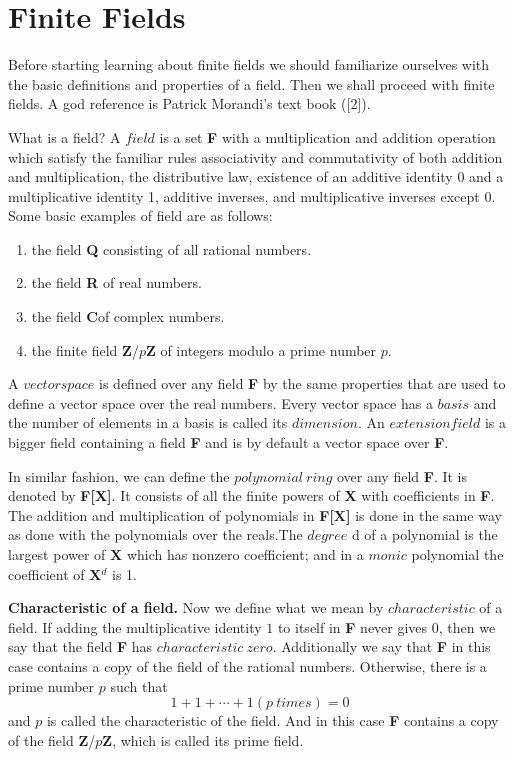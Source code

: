 \documentclass[12pt]{article}
\begin{document}
\section{Finite Fields}
Before starting learning about finite fields we should familiarize
ourselves with the basic definitions and properties of a field. Then
we shall proceed with finite fields. A god reference is Patrick
Morandi's text book ([2]).

What is a field? A $field$ is a set \textbf{F} with a  multiplication and addition operation which satisfy the familiar rules associativity and commutativity of both addition and multiplication, the distributive law, existence of an additive identity 0 and a multiplicative identity 1, additive inverses, and multiplicative inverses except 0. Some basic examples of field are as follows:
\begin{enumerate}
\item the field \textbf{Q} consisting of all rational numbers.
\item the field \textbf{R} of real numbers.
\item the field \textbf{C}of complex numbers.
\item the finite field \textbf{Z}/$p$\textbf{Z} of integers modulo a prime number $p$.
\end{enumerate}
A $vector space$ is defined over any field \textbf{F} by the same properties that are used to define a vector space over the real numbers. Every vector space has a $basis$ and the number of elements in a basis is called its $dimension$. An $extension field$ is a bigger field containing a field \textbf{F} and is by default a vector space over \textbf{F}.

In similar fashion, we can define the $polynomial \:
ring$ over any field \textbf{F}. It is denoted by \textbf{F[X]}. It consists of all the finite powers of \textbf{X} with coefficients in \textbf{F}. The addition and multiplication of polynomials in \textbf{F[X]} is done in the same way as done with the polynomials over the reals.The $degree$ d of a polynomial is the largest power of \textbf{X} which has nonzero coefficient; and in a $monic$ polynomial the coefficient of \textbf{X}$^d$ is 1.

\textbf{Characteristic of a field.} Now we define what we mean by $characteristic$ of a field. If adding the multiplicative identity $1$ to itself in \textbf{F} never gives 0, then we say that the field \textbf{F} has $characteristic \: zero$. Additionally we say that \textbf{F} in this case contains a copy of the field of the rational numbers. Otherwise, there is a prime number $p$ such that $$1+1+ \cdots +1 (p \: times)=0$$ and $p$ is called the characteristic of the field. And in this case \textbf{F} contains a copy of the field \textbf{Z}/$p$\textbf{Z}, which is called its prime field.
\end{document}

